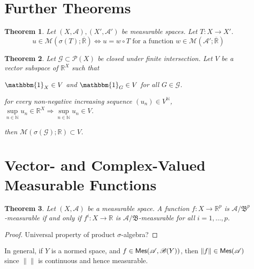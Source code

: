 \documentclass[11pt, a4paper, openany]{book}
\newtheorem{thm}{Theorem}\newtheorem{lem}{Lemma}\newtheorem{crl}{Corollary}
\theoremstyle{definition}
\newcommand{\cat}[1]{\textup{\textsf{#1}}}
\newenvironment{tight_enumerate}{\begin{enumerate}\itemsep -0.2em}{\end{enumerate}}
\begin{document}
\section{Further Theorems}
    \begin{thm}
        Let $(X,\mathscr{A}),(X',\mathscr{A}')$ be measurable spaces. Let $T:X\rightarrow X'$.
        \[u\in\mathcal{M}(\sigma(T);\overline{\mathbb{R}})\Longleftrightarrow u=w\circ T\text{ for a function } w\in \mathcal{M}(\mathscr{A}';\overline{\mathbb{R}})\]
    \end{thm}
    \begin{thm}
        Let $\mathscr{G}\subset \mathscr{P}(X)$ be closed under finite intersection. Let $V$ be a vector    subspace of $\mathbb{R}^X$ such that 
        \begin{tight_enumerate}
            \item $\mathbbm{1}_X\in V$ and $\mathbbm{1}_G\in V$ for all $G\in\mathscr{G}$.
            \item for every non-negative increasing sequence $(u_n)\in V^\mathbb{N}$, $\sup\limits_{n\in\mathbb {N}}u_n\in \mathbb{R}^X\Longrightarrow \sup\limits_{n\in\mathbb{N}}u_n\in  V$.
        \end{tight_enumerate}
        then $\mathcal{M}(\sigma(\mathscr{G});\mathbb{R})\subset V$.
    \end{thm}
\section{Vector- and Complex-Valued Measurable Functions}
    \begin{thm}
        Let $(X,\mathscr{A})$ be a measurable space. A function $f:X\rightarrow \mathbb{R}^p$ is $\mathscr{A}/\mathfrak{B}^p$-measurable if and only if $f^i:X\rightarrow \mathbb{R}$ is $\mathscr{A}/\mathfrak{B}$-measurable for all $i=1,\dots,p$.
    \end{thm}
    \begin{proof}
        Universal property of product $\sigma$-algebra?
    \end{proof}
    In general, if $Y$ is a normed space, and $f\in\cat{Mes}(\mathscr{A},\mathscr{B}(Y))$, then $\|f\|\in\cat{Mes}(\mathscr{A})$ since $\|\|$ is continuous and hence measurable.
    
\end{document}
